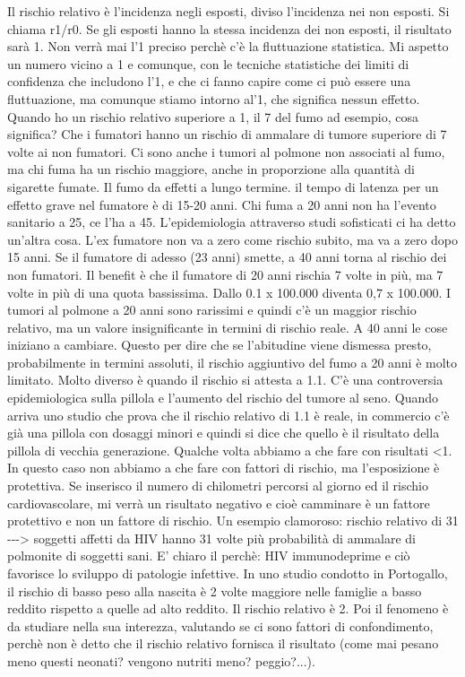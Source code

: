 Il rischio relativo è l'incidenza negli esposti, diviso l'incidenza nei
non esposti. Si chiama r1/r0. Se gli esposti hanno la stessa incidenza
dei non esposti, il risultato sarà 1. Non verrà mai l'1 preciso perchè
c'è la fluttuazione statistica. Mi aspetto un numero vicino a 1 e
comunque, con le tecniche statistiche dei limiti di confidenza che
includono l'1, e che ci fanno capire come ci può essere una
fluttuazione, ma comunque stiamo intorno al'1, che significa nessun
effetto. Quando ho un rischio relativo superiore a 1, il 7 del fumo ad
esempio, cosa significa? Che i fumatori hanno un rischio di ammalare di
tumore superiore di 7 volte ai non fumatori. Ci sono anche i tumori al
polmone non associati al fumo, ma chi fuma ha un rischio maggiore, anche
in proporzione alla quantità di sigarette fumate. Il fumo da effetti a
lungo termine. il tempo di latenza per un effetto grave nel fumatore è
di 15-20 anni. Chi fuma a 20 anni non ha l'evento sanitario a 25, ce
l'ha a 45. L'epidemiologia attraverso studi sofisticati ci ha detto
un'altra cosa. L'ex fumatore non va a zero come rischio subito, ma va a
zero dopo 15 anni. Se il fumatore di adesso (23 anni) smette, a 40 anni
torna al rischio dei non fumatori. Il benefit è che il fumatore di 20
anni rischia 7 volte in più, ma 7 volte in più di una quota bassissima.
Dallo 0.1 x 100.000 diventa 0,7 x 100.000. I tumori al polmone a 20 anni
sono rarissimi e quindi c'è un maggior rischio relativo, ma un valore
insignificante in termini di rischio reale. A 40 anni le cose iniziano a
cambiare. Questo per dire che se l'abitudine viene dismessa presto,
probabilmente in termini assoluti, il rischio aggiuntivo del fumo a 20
anni è molto limitato. Molto diverso è quando il rischio si attesta a
1.1. C'è una controversia epidemiologica sulla pillola e l'aumento del
rischio del tumore al seno. Quando arriva uno studio che prova che il
rischio relativo di 1.1 è reale, in commercio c'è già una pillola con
dosaggi minori e quindi si dice che quello è il risultato della pillola
di vecchia generazione. Qualche volta abbiamo a che fare con risultati
\textless{}1. In questo caso non abbiamo a che fare con fattori di
rischio, ma l'esposizione è protettiva. Se inserisco il numero di
chilometri percorsi al giorno ed il rischio cardiovascolare, mi verrà un
risultato negativo e cioè camminare è un fattore protettivo e non un
fattore di rischio. Un esempio clamoroso: rischio relativo di 31
-\/-\/-\textgreater{} soggetti affetti da HIV hanno 31 volte più
probabilità di ammalare di polmonite di soggetti sani. E' chiaro il
perchè: HIV immunodeprime e ciò favorisce lo sviluppo di patologie
infettive. In uno studio condotto in Portogallo, il rischio di basso
peso alla nascita è 2 volte maggiore nelle famiglie a basso reddito
rispetto a quelle ad alto reddito. Il rischio relativo è 2. Poi il
fenomeno è da studiare nella sua interezza, valutando se ci sono fattori
di confondimento, perchè non è detto che il rischio relativo fornisca il
risultato (come mai pesano meno questi neonati? vengono nutriti meno?
peggio?...).

